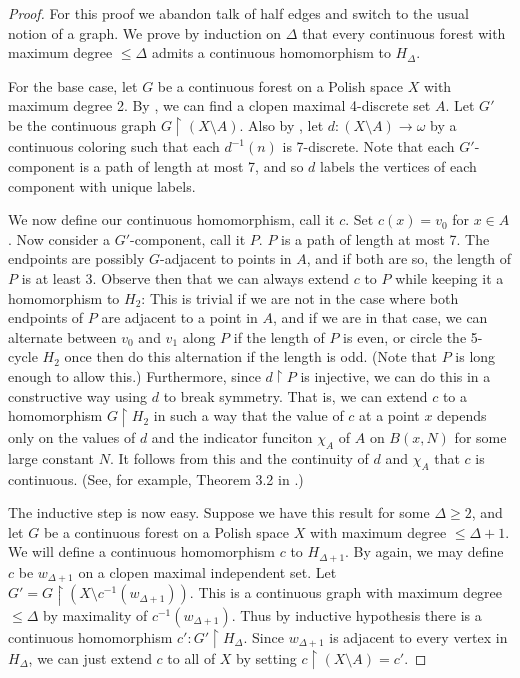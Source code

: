 \documentclass[11pt]{amsart}
\theoremstyle{definition}
\newcommand{\res}{\upharpoonright}
\newcommand{\inv}{^{-1}}
\begin{document}
\begin{proof}
For this proof we abandon talk of half edges and switch to the usual notion of a graph. We prove by induction on $\Delta$ that every continuous forest with maximum degree $\leq \Delta$ admits a continuous homomorphism to $H_\Delta$.

For the base case, let $G$ be a continuous forest on a Polish space $X$ with maximum degree 2. By \cite{bernshteyn_continuous}, we can find a clopen maximal 4-discrete set $A$. Let $G'$ be the continuous graph $G \res (X \setminus A)$. Also by \cite{bernshteyn_continuous}, let $d:(X \setminus A) \rightarrow \omega$ by a continuous coloring such that each $d\inv(n)$ is 7-discrete. Note that each $G'$-component is a path of length at most 7, and so $d$ labels the vertices of each component with unique labels.

We now define our continuous homomorphism, call it $c$. Set $c(x) = v_0$ for $x \in A$. Now consider a $G'$-component, call it $P$. $P$ is a path of length at most 7. The endpoints are possibly $G$-adjacent to points in $A$, and if both are so, the length of $P$ is at least 3. Observe then that we can always extend $c$ to $P$ while keeping it a homomorphism to $H_2$: This is trivial if we are not in the case where both endpoints of $P$ are adjacent to a point in $A$, and if we are in that case, we can alternate between $v_0$ and $v_1$ along $P$ if the length of $P$ is even, or circle the 5-cycle $H_2$ once then do this alternation if the length is odd. (Note that $P$ is long enough to allow this.) Furthermore, since $d \res P$ is injective, we can do this in a constructive way using $d$ to break symmetry. That is, we can extend $c$ to a homomorphism $G \res H_2$ in such a way that the value of $c$ at a point $x$ depends only on the values of $d$ and the indicator funciton $\chi_A$ of $A$ on $B(x,N)$ for some large constant $N$. It follows from this and the continuity of $d$ and $\chi_A$ that $c$ is continuous. (See, for example, Theorem 3.2 in \cite{BCG_Trees2}.)

The inductive step is now easy. Suppose we have this result for some $\Delta \geq 2$, and let $G$ be a continuous forest on a Polish space $X$ with maximum degree $\leq \Delta+1$. We will define a continuous homomorphism $c$ to $H_{\Delta+1}$. By \cite{bernshteyn_continuous} again, we may define $c$ be $w_{\Delta+1}$ on a clopen maximal independent set. Let $G' = G \res (X \setminus c\inv(w_{\Delta+1}))$. This is a continuous graph with maximum degree $\leq \Delta$ by maximality of $c\inv(w_{\Delta+1})$. Thus by inductive hypothesis there is a continuous homomorphism $c':G' \res H_\Delta$. Since $w_{\Delta+1}$ is adjacent to every vertex in $H_\Delta$, we can just extend $c$ to all of $X$ by setting $c \res (X \setminus A) = c'$.
\end{proof}
\end{document}
